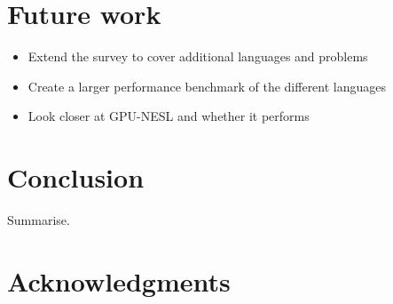 \documentclass{llncs2e/llncs}
\begin{document}
\section{Future work}
\begin{itemize}
\item Extend the survey to cover additional languages and problems
\item Create a larger performance benchmark of the different languages
\item Look closer at GPU-NESL and whether it performs
\end{itemize}

\section{Conclusion}
Summarise.

\section{Acknowledgments}

 

\end{document}
